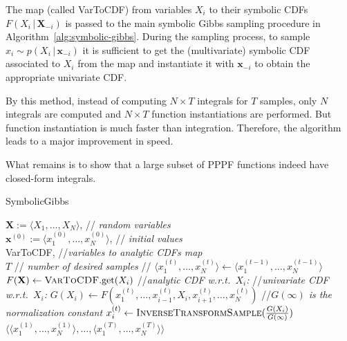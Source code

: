 \documentclass{article}
\newcommand{\tuple}[1] {\langle #1 \rangle}
\newcommand{\bvec}[1]{\textbf{#1}}
\newcommand{\pr}{p}
\begin{document}
The map (called {\sc VarToCDF}) from variables $X_i$ to their symbolic CDFs
$F(X_i \,|\, \bvec{X}_{-i})$ is passed to the main symbolic Gibbs sampling procedure in Algorithm~\ref{alg:symbolic-gibbs}.
During the sampling process, 
to sample $x_i \sim \pr(X_i \,|\, \bvec{x}_{-i})$
it is sufficient to get the (multivariate) symbolic CDF associated to $X_i$ from the map
and instantiate it with $\bvec{x}_{-i}$ to obtain the appropriate univariate CDF.

By this method, instead of computing $N \times T$ integrals for $T$ samples, only $N$ integrals are computed and 
$N \times T$ function instantiations are performed. But function instantiation is much faster than integration.
Therefore, the algorithm leads to a major improvement in speed.

What remains is to show that a large subset of PPPF functions indeed have closed-form integrals. 


\begin{algorithm}[hb!]%
\caption{{\sc SymbolicGibbs}  
\label{alg:symbolic-gibbs}}
\begin{algorithmic}
{$\bvec{X} := \tuple{X_1, \ldots, X_N}$, 				\hspace*{\fill}// \emph{\small random variables} \\
 $\bvec{x}^{(0)} := \tuple{x_1^{(0)}, \ldots, x_N^{(0)}}$, 	\hspace*{\fill}// \emph{\small initial values} \\
{\sc VarToCDF}, 								\hspace*{\fill}//\emph{\small variables to analytic CDFs map} \\
 $T$ 										\hspace*{\fill}// \emph{\small number of desired samples } }
//%
{\small
	 \STATE $\tuple{x_1^{(t)}, \ldots, x_N^{(t)}} \leftarrow \tuple{x_1^{(t-1)}, \ldots, x_N^{(t-1)}}$    
	\FOR{ {\bf each} $X_i \in \bvec{X}$}
		\STATE $F(\bvec{X}) \leftarrow \textsc{VarToCDF}.\text{get}(X_i)$ //\emph{analytic CDF w.r.t.\ $X_i$:}
		\STATE //\emph{univariate CDF w.r.t.\ $X_i$:}
		\STATE 	$G(X_i) \leftarrow F(x_1^{(t)}, \ldots, x_{i-1}^{(t)}, X_i, x_{i+1}^{(t)}, \ldots, x_N^{(t)})$ 
		\STATE //\emph{$G(\infty)$ is the normalization constant}
		\STATE $x_i^{(t)} \leftarrow \textsc{InverseTransformSample}(\frac{G(X_i)}{G(\infty)})$
	\ENDFOR %
\ENDFOR %
 {$\big\langle
			\tuple{x_1^{(1)}, \ldots, x_N^{(1)}}, \ldots, 
			\tuple{x_1^{(T)}, \ldots, x_N^{(T)}}
		\big\rangle$}\;
%	
} %
\end{algorithmic}
\end{algorithm}
\end{document}

